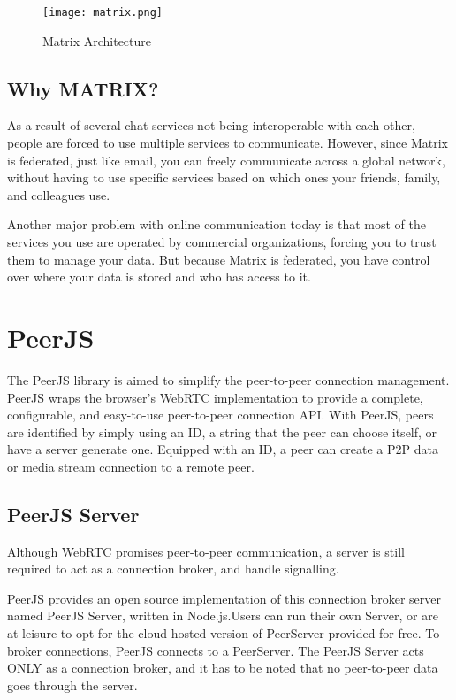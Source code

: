 \begin{figure}[h]
    \begin{center}
        \texttt{[image: matrix.png]}
    \end{center}
    \caption{Matrix Architecture}
    \label{fig:matrix}
\end{figure}

\subsection{Why MATRIX?}

As a result of several chat services not being interoperable with each other, people are 
forced to use multiple services to communicate.
However, since Matrix is federated, just like email, you can freely communicate across a 
global network, without having to use specific services based on which ones your friends, 
family, and colleagues use.

Another major problem with online communication today is that most of the services you
use are operated by commercial organizations, forcing you to trust them to manage your data.
But because Matrix is federated, you have control over where your data is stored and who has access to it. 

\section{PeerJS}

The PeerJS library is aimed to simplify the peer-to-peer connection management. 
PeerJS wraps the browser's WebRTC implementation to provide a complete, configurable, 
and easy-to-use peer-to-peer connection API. 
With PeerJS, peers are identified by simply using an ID, a string that the peer 
can choose itself, or have a server generate one. 
Equipped with an ID, a peer can create a P2P data or media stream connection to a remote peer.

\subsection{PeerJS Server}

Although WebRTC promises peer-to-peer communication, a server is still required to 
act as a connection broker, and handle signalling.

PeerJS provides an open source implementation of this connection broker 
server named PeerJS Server, written in Node.js.Users can run their own Server, 
or are at leisure to opt for the cloud-hosted version of PeerServer provided for free.
To broker connections, PeerJS connects to a PeerServer. The PeerJS Server acts ONLY as 
a connection broker, and it has to be noted that no peer-to-peer data goes through the server.

